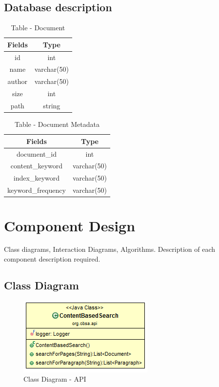 \documentclass[oneside,a4paper,12pt]{report}
\begin{document}
{\subsection{Database description}
\begin{table}[!htbp]
\begin{center}
\def\arraystretch{1.5}
  \begin{tabular}{| c | c |}
       \hline
       
Fields & Type \\ \hline
id & int \\ \hline
name & varchar(50) \\ \hline
author & varchar(50) \\ \hline
size & int \\ \hline
path & string \\ \hline
       
\end{tabular}
 \caption { Table - Document  }
 \label{tab:hreq}
\end{center}

\end{table}

\begin{table}[!htbp]
\begin{center}
\def\arraystretch{1.5}
  \begin{tabular}{| c | c |}
       \hline
       
Fields & Type \\ \hline
document\_id & int \\ \hline
content\_keyword & varchar(50) \\ \hline
index\_keyword & varchar(50) \\ \hline
keyword\_frequency & varchar(50) \\ \hline
       
\end{tabular}
 \caption { Table - Document Metadata  }
 \label{tab:hreq}
\end{center}

\end{table}
\newpage


\section{Component Design} 
Class diagrams, Interaction Diagrams, Algorithms. Description of each component description required.

\subsection{Class Diagram}
\begin{figure}[H]
\includegraphics{class-dig-api}
\caption{Class Diagram - API}
\end{figure}

}
\end{document}
